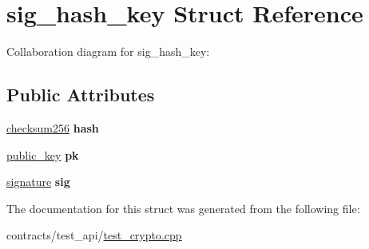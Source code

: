 \hypertarget{structsig__hash__key}{}\section{sig\+\_\+hash\+\_\+key Struct Reference}
\label{structsig__hash__key}


Collaboration diagram for sig\+\_\+hash\+\_\+key\+:
\subsection*{Public Attributes}
\begin{DoxyCompactItemize}
\item 
\mbox{\label{structsig__hash__key_af3ef2e45b37a5fde34a62dcd424aa3a6}} 
\mbox{\hyperlink{structchecksum256}{checksum256}} {\bfseries hash}
\item 
\mbox{\label{structsig__hash__key_a992603801dd65c6865df702c94bcfbf0}} 
\mbox{\hyperlink{structpublic__key}{public\+\_\+key}} {\bfseries pk}
\item 
\mbox{\label{structsig__hash__key_a5afec2d3b652bad19d78477043ca6677}} 
\mbox{\hyperlink{structsignature}{signature}} {\bfseries sig}
\end{DoxyCompactItemize}


The documentation for this struct was generated from the following file\+:\begin{DoxyCompactItemize}
\item 
contracts/test\+\_\+api/\mbox{\hyperlink{test__crypto_8cpp}{test\+\_\+crypto.\+cpp}}\end{DoxyCompactItemize}
